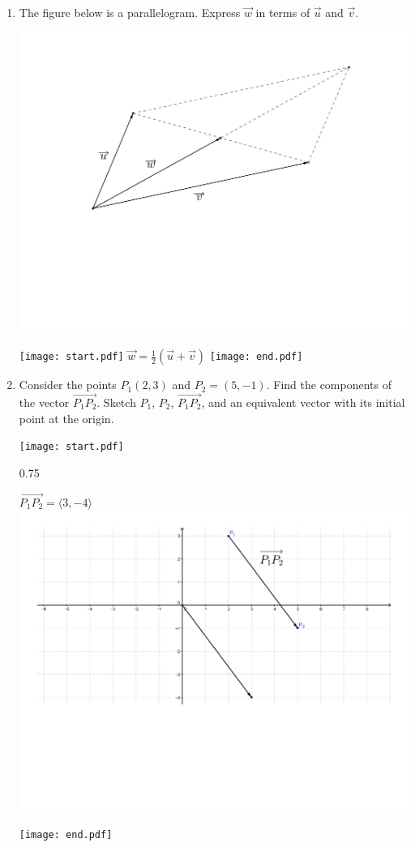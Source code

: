 \documentclass[12pt]{article}
\begin{document}
\begin{enumerate}
\item The figure below is a parallelogram.  Express $\overrightarrow{w}$ in terms of $\overrightarrow{u}$ and $\overrightarrow{v}$.

\begin{center}
\includegraphics[scale=0.4]{vector3.pdf}
\end{center}

\texttt{[image: start.pdf]}
{{$\overrightarrow{w}=\frac{1}{2}\left(\overrightarrow{u}+\overrightarrow{v}\right)$}}
\texttt{[image: end.pdf]}


\newpage

\item Consider the points $P_1(2,3)$ and $P_2=(5,-1)$. Find the components of the vector $\overrightarrow{P_1P_2}$.  Sketch $P_1$, $P_2$, $\overrightarrow{P_1P_2}$, and an equivalent vector with its initial point at the origin.

\texttt{[image: start.pdf]}
{{{0.75\linewidth}{\begin{center}$\overrightarrow{P_1P_2}=\langle 3,-4 \rangle$\\
\includegraphics[scale=0.3]{vector4.pdf}\end{center} }}}
\texttt{[image: end.pdf]}



\end{enumerate}
\end{document}
